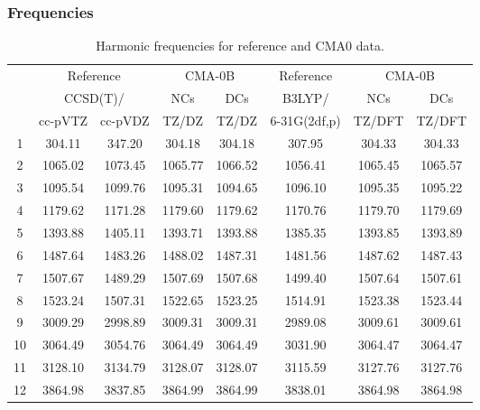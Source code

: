 \documentclass[10pt,oneside]{article}
\begin{document}
\clearpage

\subsubsection*{Frequencies}
\begin{table}[h!]
\centering
\caption{Harmonic frequencies for reference and CMA0 data.}
\begin{tabular}{cccccccc}
\toprule
{} & \multicolumn{2}{c}{Reference} & \multicolumn{2}{c}{CMA-0B} &    Reference & \multicolumn{2}{c}{CMA-0B} \\
{} & \multicolumn{2}{c}{CCSD(T)/} &     NCs &     DCs &       B3LYP/ &     NCs &     DCs \\
{} &   cc-pVTZ & cc-pVDZ &   TZ/DZ &   TZ/DZ & 6-31G(2df,p) &  TZ/DFT &  TZ/DFT \\
\midrule
1  &    304.11 &  347.20 &  304.18 &  304.18 &       307.95 &  304.33 &  304.33 \\
2  &   1065.02 & 1073.45 & 1065.77 & 1066.52 &      1056.41 & 1065.45 & 1065.57 \\
3  &   1095.54 & 1099.76 & 1095.31 & 1094.65 &      1096.10 & 1095.35 & 1095.22 \\
4  &   1179.62 & 1171.28 & 1179.60 & 1179.62 &      1170.76 & 1179.70 & 1179.69 \\
5  &   1393.88 & 1405.11 & 1393.71 & 1393.88 &      1385.35 & 1393.85 & 1393.89 \\
6  &   1487.64 & 1483.26 & 1488.02 & 1487.31 &      1481.56 & 1487.62 & 1487.43 \\
7  &   1507.67 & 1489.29 & 1507.69 & 1507.68 &      1499.40 & 1507.64 & 1507.61 \\
8  &   1523.24 & 1507.31 & 1522.65 & 1523.25 &      1514.91 & 1523.38 & 1523.44 \\
9  &   3009.29 & 2998.89 & 3009.31 & 3009.31 &      2989.08 & 3009.61 & 3009.61 \\
10 &   3064.49 & 3054.76 & 3064.49 & 3064.49 &      3031.90 & 3064.47 & 3064.47 \\
11 &   3128.10 & 3134.79 & 3128.07 & 3128.07 &      3115.59 & 3127.76 & 3127.76 \\
12 &   3864.98 & 3837.85 & 3864.99 & 3864.99 &      3838.01 & 3864.98 & 3864.98 \\
\bottomrule
\end{tabular}
\end{table}

\clearpage
\end{document}
